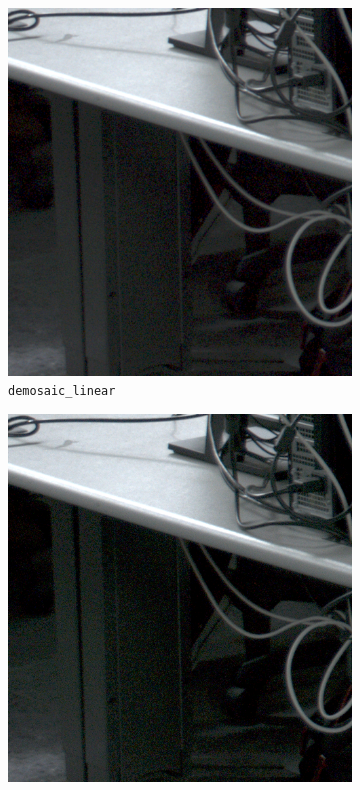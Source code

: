 \documentclass{article}
\newcommand{\inlinecode}[1]{\lstinline[basicstyle=\ttfamily,keywordstyle={}]{#1}}
\begin{document}
\begin{figure}[htbp]
  \centering
  \begin{subfigure}{.33\textwidth}
  \centering
  \includegraphics[width=.95\linewidth]{demosaic_students2_detail}
  \caption{\inlinecode{demosaic_linear}}
\end{subfigure}%
\begin{subfigure}{.33\textwidth}
  \centering
  \includegraphics[width=.95\linewidth]{matlab_demosaic_students2_detail}

\end{subfigure}
\end{figure}
\end{document}
